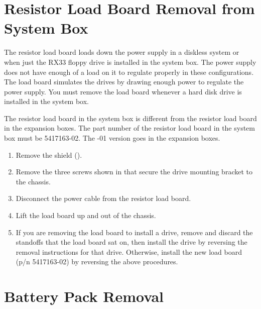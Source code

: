 \section{Resistor Load Board Removal from System Box}

The resistor load board loads down the power supply in a diskless system
or when just the RX33 floppy drive is installed in the system box. The
power supply does not have enough of a load on it to regulate properly
in these configurations. The load board simulates the drives by drawing
enough power to regulate the power supply. You must remove the load
board whenever a hard disk drive is installed in the system box.

The resistor load board in the system box is different from the resistor load
board in the expansion boxes. The part number of the resistor load board in
the system box must be 5417163-02. The -01 version goes in the expansion
boxes.

\begin{enumerate}

\item	Remove the shield ().

\item	Remove the three screws shown in  that secure the drive
		mounting bracket to the chassis.

\item	Disconnect the power cable from the resistor load board.

\item	Lift the load board up and out of the chassis.

\item	If you are removing the load board to install a drive, remove and 
		discard the standoffs that the load board sat on, then install the drive by
		reversing the removal instructions for that drive. Otherwise, install the
		new load board (p/n 5417163-02) by reversing the above procedures.

\end{enumerate}

\newpage


\newpage

\section{Battery Pack Removal}

